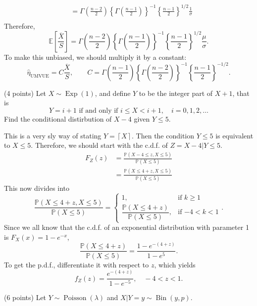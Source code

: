 \documentclass[answers]{exam}
\newcommand{\opn}{\operatorname}
\begin{document}
\begin{questions}
\begin{solution}
\begin{align*}
   &= \Gamma\left(\frac{n-2}{2}\right)\left\{\Gamma\left(\frac{n-1}{2}\right) \right\}^{-1}\left\{\frac{n-1}{2} \right\}^{1/2}\frac{1}{\sigma}\\
   \end{align*}
   Therefore,
   $$
   \mathbb{E}\left[\frac{\overline{X}}{S}\right] = \Gamma\left(\frac{n-2}{2}\right)\left\{\Gamma\left(\frac{n-1}{2}\right) \right\}^{-1}\left\{\frac{n-1}{2} \right\}^{1/2}\frac{\mu}{\sigma}.
   $$
   To make this unbiased, we should multiply it by a constant:
   $$
   \hat{\eta}_{\text{UMVUE}} = C\frac{\overline{X}}{S}, \qquad C = \Gamma\left(\frac{n-1}{2}\right)\left\{\Gamma\left(\frac{n-2}{2}\right) \right\}^{-1}\left\{\frac{n-1}{2} \right\}^{-1/2}.
   $$
   \end{solution}
   \question
   (4 points) Let $X \sim \opn{Exp}\left(1\right)$, and define $Y$ to be the integer part of $X+1$, that is
   $$
   Y = i + 1 \text{ if and only if } i \leq X < i+1, \quad i = 0, 1, 2, \ldots
   $$
   Find the conditional distirbution of $X-4$ given $Y\leq 5$.
   \begin{solution}
   This is a very sly way of stating $Y = \left\lceil X \right \rceil$. Then the condition $Y \leq 5$ is equivalent to $X \leq 5$. Therefore, we should start with the c.d.f. of $Z = X-4|Y\leq 5$.
   \begin{align*}
   F_{Z}\left(z\right) &= \frac{\mathbb{P}\left(X-4\leq z , X\leq 5\right)}{\mathbb{P}\left(X \leq 5\right)}\\
   &= \frac{\mathbb{P}\left(X \leq 4+z, X\leq 5\right)}{\mathbb{P}\left(X \leq 5\right)}
   \end{align*}
   This now divides into
   $$
   \frac{\mathbb{P}\left(X \leq 4+z, X\leq 5\right)}{\mathbb{P}\left(X \leq 5\right)} = \begin{cases} 1, & \text{if $k \geq 1$}\\ \dfrac{\mathbb{P}\left(X \leq 4+z\right)}{\mathbb{P}\left(X\leq 5\right)}, & \text{if $-4<k<1$} \end{cases}.
   $$
   Since we all know that the c.d.f. of an exponential distribution with parameter 1 is $F_{X}\left(x\right) = 1-e^{-x}$,
   $$
   \frac{\mathbb{P}\left(X \leq 4+z\right)}{\mathbb{P}\left(X\leq 5\right)} = \frac{1-e^{-\left(4+z\right)}}{1-e^{5}}.
   $$
   To get the p.d.f., differentiate it with respect to $z$, which yields
   $$
   f_{Z}\left(z\right) = \frac{e^{-\left(4+z\right)}}{1-e^{-5}},\quad -4<z<1.
   $$
   \end{solution}
   \question
   (6 points) Let $Y \sim \opn{Poisson}\left(\lambda\right)$ and $X|Y=y \sim \opn{Bin}\left(y,p\right)$.

\end{questions}
\end{document}
